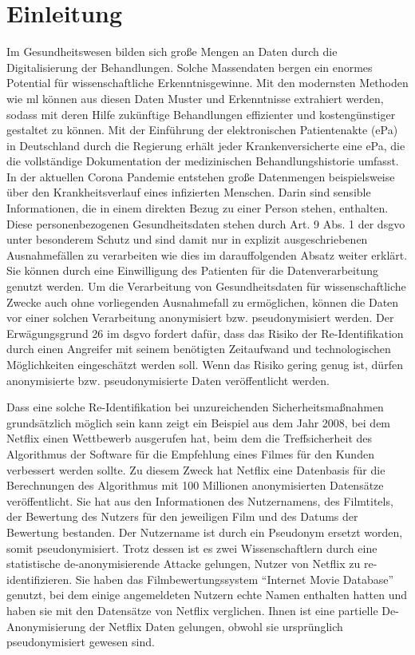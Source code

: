 \chapter{Einleitung}
Im Gesundheitswesen bilden sich große Mengen an Daten durch die Digitalisierung der Behandlungen. Solche Massendaten bergen ein enormes Potential für wissenschaftliche Erkenntnisgewinne. Mit den modernsten Methoden wie \gls{ml} können aus diesen Daten Muster und Erkenntnisse extrahiert werden, sodass mit deren Hilfe zukünftige Behandlungen effizienter und kostengünstiger gestaltet zu können. Mit der Einführung der elektronischen Patientenakte (\gls{ePa}) in Deutschland durch die Regierung erhält jeder Krankenversicherte eine \gls{ePa}, die die vollständige Dokumentation der medizinischen Behandlungshistorie umfasst. In der aktuellen Corona Pandemie entstehen große Datenmengen beispielsweise über den Krankheitsverlauf eines infizierten Menschen. Darin sind sensible Informationen, die in einem direkten Bezug zu einer Person stehen, enthalten. Diese personenbezogenen Gesundheitsdaten stehen durch Art. 9 Abs. 1 der \gls{dsgvo} unter besonderem Schutz und sind damit nur in explizit ausgeschriebenen Ausnahmefällen zu verarbeiten wie dies im darauffolgenden Absatz weiter erklärt. Sie können durch eine Einwilligung des Patienten für die Datenverarbeitung genutzt werden. Um die Verarbeitung von Gesundheitsdaten für wissenschaftliche Zwecke auch ohne vorliegenden Ausnahmefall zu ermöglichen, können die Daten vor einer solchen Verarbeitung anonymisiert bzw. pseudonymisiert werden. Der Erwägungsgrund 26 im \gls{dsgvo} fordert dafür, dass das Risiko der Re-Identifikation durch einen Angreifer mit seinem benötigten Zeitaufwand und technologischen Möglichkeiten eingeschätzt werden soll. Wenn das Risiko gering genug ist, dürfen anonymisierte bzw. pseudonymisierte Daten veröffentlicht werden.


Dass eine solche Re-Identifikation bei unzureichenden Sicherheitsmaßnahmen grundsätzlich möglich sein kann zeigt ein Beispiel aus dem Jahr 2008, bei dem Netflix \parencite{NetflixDataset} einen Wettbewerb ausgerufen hat, beim dem die Treffsicherheit des Algorithmus der Software für die Empfehlung eines Filmes für den Kunden verbessert werden sollte. Zu diesem Zweck hat Netflix eine Datenbasis für die Berechnungen des Algorithmus mit 100 Millionen anonymisierten Datensätze veröffentlicht. Sie hat aus den Informationen des Nutzernamens, des Filmtitels, der Bewertung des Nutzers für den jeweiligen Film und des Datums der Bewertung bestanden. Der Nutzername ist durch ein Pseudonym ersetzt worden, somit pseudonymisiert. Trotz dessen ist es zwei Wissenschaftlern durch eine statistische de-anonymisierende Attacke gelungen, Nutzer von Netflix zu re-identifizieren. Sie haben das Filmbewertungssystem \enquote{Internet Movie Database} genutzt, bei dem einige angemeldeten Nutzern echte Namen enthalten hatten und haben sie mit den Datensätze von Netflix verglichen. Ihnen ist eine partielle De-Anonymisierung der Netflix Daten gelungen, obwohl sie ursprünglich pseudonymisiert gewesen sind.


